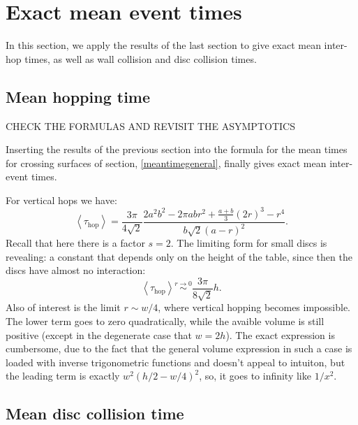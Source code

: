 \documentclass[superscriptaddress,pre,reprint,showpacs,onecolumn]{revtex4-1}
\newcommand{\mean}[1]{\left \langle #1 \right \rangle}
\begin{document}
\section{Exact mean event times}

In this section, we apply the results of the last section to give
exact mean inter-hop times, as well as wall collision and disc collision times.

\subsection{Mean hopping time}

 CHECK THE FORMULAS AND REVISIT THE ASYMPTOTICS 
 
Inserting the results of the previous section 
into the formula for the mean times for crossing
surfaces of section, \eqref{meantimegeneral}, finally gives exact mean inter-event times.

For vertical
hops we have:
\begin{equation}\label{hoptau}
 \mean{\tau_\text{hop}} = 	
\frac{3 \pi}{4\sqrt{2}}
\frac{2 a^{2} b^{2}  - 2 \pi a b r^{2} + \textstyle \frac{a+b}{3}  (2r)^{3}  -  r^4}
{ b \sqrt{2}  ( a - r )^2}.
\end{equation}
Recall that here there is a factor $s = 2$.
The limiting form for small discs is revealing: a constant
that depends only on the height of the table, since then the discs have almost no interaction:
\begin{equation}\label{hoptaulimit}
 \mean{\tau_\text{hop}} \overset{r \to 0}{\sim}
\frac{3 \pi}{8\sqrt{2}}h.
\end{equation}
Also of interest is the limit $r\sim w/4$, where vertical hopping becomes
impossible.  The lower term goes to zero quadratically, while the avaible volume
is still positive (except in the degenerate case that $w=2h$). The exact expression
is cumbersome, due to the fact that the general volume expression in such a
case is loaded with inverse trigonometric functions and doesn't appeal to
intuiton, but the leading term is exactly $w^2(h/2-w/4)^2$, so, it goes to infinity
like $1/x^2$. 



\subsection{Mean disc collision time}
\end{document}
